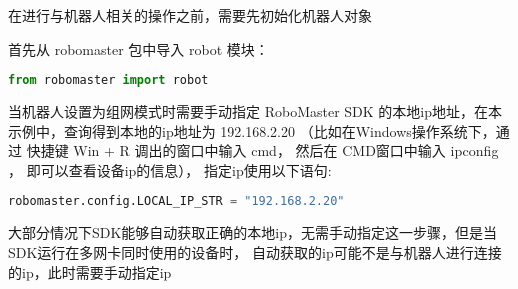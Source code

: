 
在进行与机器人相关的操作之前，需要先初始化机器人对象

首先从 robomaster 包中导入 robot 模块：

\begin{lstlisting}[language=python]
from robomaster import robot
\end{lstlisting}

当机器人设置为组网模式时需要手动指定 RoboMaster SDK 的本地ip地址，在本示例中，查询得到本地的ip地址为 192.168.2.20 （比如在Windows操作系统下，通过 快捷键 Win + R 调出的窗口中输入 cmd， 然后在 CMD窗口中输入 ipconfig ， 即可以查看设备ip的信息）， 指定ip使用以下语句:

\begin{lstlisting}[language=python]
robomaster.config.LOCAL_IP_STR = "192.168.2.20"
\end{lstlisting}

大部分情况下SDK能够自动获取正确的本地ip，无需手动指定这一步骤，但是当SDK运行在多网卡同时使用的设备时， 自动获取的ip可能不是与机器人进行连接的ip，此时需要手动指定ip
